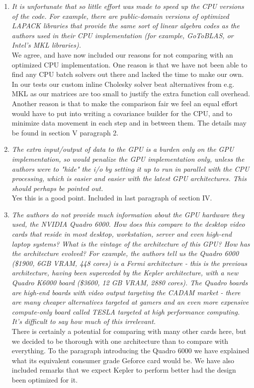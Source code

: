 \documentclass[11pt]{article} %
\newcommand\1{\vec 1}
\newcommand\q[1]{\textit{#1}}
\newcommand\qi[1]{\item\q{#1}}
\newcommand\ans[1]{#1}
\newcommand\ai[1]{\\[.5\baselineskip]\ans{#1}}
\begin{document}
\begin{enumerate}
\qi{It is unfortunate that so little effort was made to speed up the CPU versions of the code. For example, there are public-domain versions of optimized LAPACK libraries that provide the same sort of linear algebra codes as the authors used in their CPU implementation (for example, GoToBLAS, or Intel's MKL libraries).}
\ai{We agree, and have now included our reasons for not comparing with an optimized CPU implementation.  One reason is that we have not been able to find any CPU batch solvers out there and lacked the time to make our own. In our tests our custom inline Cholesky solver beat alternatives from e.g. MKL as our matrices are too small to justify the extra function call overhead. Another reason is that to make the comparison fair we feel an equal effort would have to put into writing a covariance builder for the CPU, and to minimize data movement in each step and in between them. The details may be found in section V paragraph 2.}
%
\qi{The extra input/output of data to the GPU is a burden only on the GPU implementation, so would penalize the GPU implementation only, unless the authors were to "hide" the i/o by setting it up to run in parallel with the CPU processing, which is easier and easier with the latest GPU architectures. This should perhaps be pointed out.}
\ai{Yes this is a good point. Included in last paragraph of section IV.}
%
\qi{The authors do not provide much information about the GPU hardware they used, the NVIDIA Quadro 6000. How does this compare to the desktop video cards that reside in most desktop, workstation, server and even high-end laptop systems? What is the vintage of the architecture of this GPU? How has the architecture evolved? For example, the authors tell us the Quadro 6000 (\$1900, 6GB VRAM, 448 cores) is a Fermi architecture - this is the previous architecture, having been superceded by the Kepler architecture, with a new Quadro K6000 board (\$3600, 12 GB VRAM, 2880 cores). The Quadro boards are high-end boards with video output targeting the CADAM market - there are many cheaper alternatives targeted at gamers and an even more expensive compute-only board called TESLA targeted at high performance computing. It's difficult to say how much of this irrelevant.}
\ai{There is certainly a potential for comparing with many other cards here, but we decided to be thorough with one architecture than to compare with everything. To the paragraph introducing the Quadro 6000 we have explained what its equivalent consumer grade Geforce card would be. We have also included remarks that we expect Kepler to perform better had the design been optimized for it.}

\end{enumerate}
\end{document}
